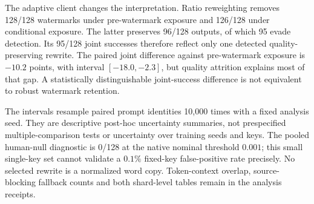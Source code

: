 The adaptive client changes the interpretation. Ratio reweighting removes 128/128 watermarks under pre-watermark exposure and 126/128 under conditional exposure. The latter preserves 96/128 outputs, of which 95 evade detection. Its 95/128 joint successes therefore reflect only one detected quality-preserving rewrite. The paired joint difference against pre-watermark exposure is $-10.2$ points, with interval $[-18.0,-2.3]$, but quality attrition explains most of that gap. A statistically distinguishable joint-success difference is not equivalent to robust watermark retention.

The intervals resample paired prompt identities 10,000 times with a fixed analysis seed. They are descriptive post-hoc uncertainty summaries, not prespecified multiple-comparison tests or uncertainty over training seeds and keys. The pooled human-null diagnostic is 0/128 at the native nominal threshold $0.001$; this small single-key set cannot validate a $0.1\%$ fixed-key false-positive rate precisely. No selected rewrite is a normalized word copy. Token-context overlap, source-blocking fallback counts and both shard-level tables remain in the analysis receipts.
